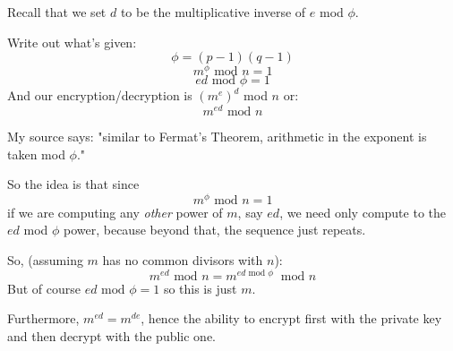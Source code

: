 \documentclass[11pt, oneside]{article}
\begin{document}
Recall that we set $d$ to be the multiplicative inverse of $e$ mod $\phi$. 

Write out what's given:
\[ \phi = (p - 1)(q - 1) \]
\[ m^{\phi} \text{ mod } n = 1 \]
\[ ed  \text{ mod } \phi = 1 \]
And our encryption/decryption is $(m^{e})^{d}$ mod $n$  or:
\[ m^{ed} \text{ mod } n \]

My source says:  "similar to Fermat's Theorem, arithmetic in the exponent is taken mod $\phi$."  

So the idea is that since  
\[ m^{\phi} \text{ mod } n = 1 \]
if we are computing any \emph{other} power of $m$, say $ed$, we need only compute to the $ed$ mod $\phi$ power, because beyond that, the sequence just repeats.

So, (assuming $m$ has no common divisors with $n$):
\[ m^{ed} \text{ mod } n = m^{ed \text{ mod } \phi} \ \text{ mod } n \]
But of course $ed \text{ mod } \phi = 1$ so this is just $m$.

Furthermore, $m^{ed} = m^{de}$, hence the ability to encrypt first with the private key and then decrypt with the public one.
\end{document}

